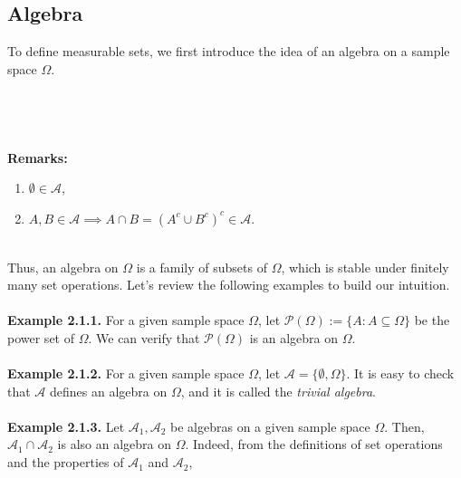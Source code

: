 \documentclass{article}
\begin{document}
\subsection{Algebra}
To define measurable sets, we first introduce the idea of an algebra on a sample space $\Omega$.\\\\
\noindent{}\\\\\\
\textbf{Remarks:}
\begin{enumerate}
	\item $\emptyset \in \mathcal{A}$,
	\item $A, B \in \mathcal{A} \implies A \cap B = (A^c \cup B^c)^c \in \mathcal{A}$.
\end{enumerate}
\ \\Thus, an algebra on $\Omega$ is a family of subsets of $\Omega$, which is stable under finitely many set operations. Let's review the following examples to build our intuition.\\\\
\textbf{Example 2.1.1.} For a given sample space $\Omega$, let $\mathcal{P}(\Omega) := \{A: A \subseteq \Omega\}$ be the power set of $\Omega$. We can verify that $\mathcal{P}(\Omega)$ is an algebra on $\Omega$.\\\\
\textbf{Example 2.1.2.} For a given sample space $\Omega$, let $\mathcal{A} = \{\emptyset, \Omega\}$. It is easy to check that $\mathcal{A}$ defines an algebra on $\Omega$, and it is called the \textit{trivial algebra}. \\\\
\textbf{Example 2.1.3.} Let $\mathcal{A}_1, \mathcal{A}_2$ be algebras on a given sample space $\Omega$. Then, $\mathcal{A}_1 \cap \mathcal{A}_2$ is also an algebra on $\Omega$. Indeed, from the definitions of set operations and the properties of $\mathcal{A}_1$ and $\mathcal{A}_2$,
\end{document}

